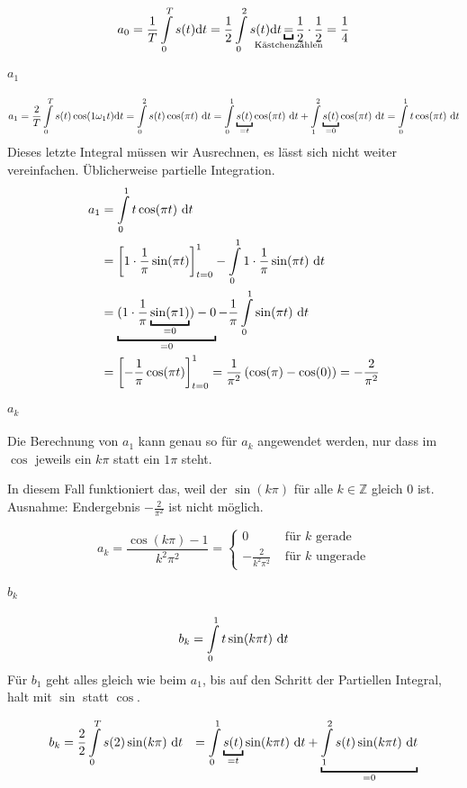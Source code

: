 \[
	a_0 = \frac{1}{T} \int\limits^T_0 s(t) \mathrm{d}t = \frac{1}{2} \int\limits^2_0 s(t) \mathrm{d}t \underbracket{=}_{\mathclap{\text{Kästchenzählen}}} \frac{1}{2} \cdot \frac{1}{2} = \frac{1}{4}
\]

\paragraph{$a_1$}

\[
	a_1 = \frac{2}{T} \int\limits^T_0 s(t) \cos(1 \omega_1 t) \mathrm{d}t
	 = \int\limits^2_0 s(t) \cos(\pi t) \dt
	 = \int\limits^1_0 \underbracket{s(t)}_{=t} \cos(\pi t) \dt + \int\limits^2_1 \underbracket{s(t)}_{=0} \cos(\pi t) \dt
	 = \int\limits^1_0 t \cos (\pi t) \dt
\]
Dieses letzte Integral müssen wir Ausrechnen, es lässt sich nicht weiter vereinfachen. Üblicherweise partielle Integration.
\begin{align}
	a_1 &= \int\limits^1_0 t \cos(\pi t) \dt \\
		&= \left[ 1 \cdot \frac{1}{\pi} \sin(\pi t) \right]^1_{t=0} - \int\limits^1_0 1 \cdot \frac{1}{\pi} \sin( \pi t) \dt \\
		&= \underbracket{(1 \cdot \frac{1}{\pi} \underbracket{\sin(\pi 1)}_{=0}) - 0}_{=0} - \frac{1}{\pi} \int\limits^1_0 \sin( \pi t) \dt \\
		&= \left[ - \frac{1}{\pi} \cos(\pi t) \right]^1_{t=0}  = \frac{1}{\pi^2} \left( \cos(\pi) - \cos(0)\right) = - \frac{2}{\pi^2}
\end{align}

\paragraph{$a_k$}

Die Berechnung von $a_1$ kann genau so für $a_k$ angewendet werden, nur dass im $\cos$ jeweils ein $k \pi$ statt ein $1 \pi$ steht.

In diesem Fall funktioniert das, weil der $\sin(k\pi)$ für alle $k \in \mathbb{Z}$ gleich $0$ ist. Ausnahme: Endergebnis $- \frac{2}{\pi^2}$ ist nicht möglich.

\[
	a_k = \frac{\cos(k \pi) -1}{k^2 \pi^2} = \begin{cases}
		0 & \text{ für } k \text{ gerade} \\
		- \frac{2}{k^2 \pi^2} & \text{ für } k \text{ ungerade}
	\end{cases}
\]


\paragraph{$b_k$}
\[
	b_k = \int\limits^1_0 t \sin(k \pi t) \text{ }\mathrm{d}t
\]
Für $b_1$ geht alles gleich wie beim $a_1$, bis auf den Schritt der Partiellen Integral, halt mit $\sin$ statt $\cos$.

\begin{align*}
	b_k &= \frac{2}{2} \int\limits^T_0 s(2) \sin(k \pi) \dt
		&= \int\limits^1_0 \underbracket{s(t)}_{=t} \sin(k \pi t) \dt + \underbracket{\int\limits^2_1 s(t) \sin(k \pi t) \dt}_{=0}
\end{align*}




